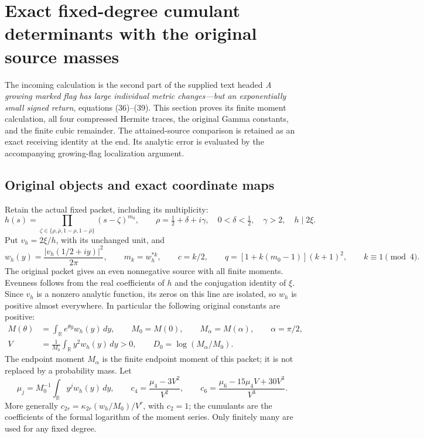\section{Exact fixed-degree cumulant determinants with the original source masses}
\label{sec:FCD}

The incoming calculation is the second part of the supplied text headed
\emph{A growing marked flag has large individual metric changes---but an
exponentially small signed return}, equations (36)--(39).
This section proves its finite moment calculation, all four compressed
Hermite traces, the original Gamma constants, and the finite cubic
remainder. The attained-source comparison is retained as an exact receiving
identity at the end. Its analytic error is evaluated by the accompanying
growing-flag localization argument.

\subsection{Original objects and exact coordinate maps}

Retain the actual fixed packet, including its multiplicity:
\[
 h(s)=\prod_{\zeta\in\{\rho,\bar\rho,1-\rho,1-\bar\rho\}}
       (s-\zeta)^{m_0},\qquad
 \rho=\tfrac12+\delta+i\gamma,\quad
 0<\delta<\tfrac12,\quad\gamma>2,\quad h\mid2\xi.
\]
Put \(v_h=2\xi/h\), with its unchanged unit, and
\[
 w_h(y)=\frac{|v_h(1/2+iy)|^2}{2\pi},\qquad
 m_k=w_h^{*k},\qquad c=k/2,\qquad
 q=[1+k(m_0-1)](k+1)^2,\qquad k\equiv1\pmod4.
\]
The original packet gives an even nonnegative source with all finite moments.
Evenness follows from the real coefficients of \(h\) and the conjugation
identity of \(\xi\). Since \(v_h\) is a nonzero analytic function, its
zeros on this line are isolated, so \(w_h\) is positive almost everywhere.
In particular the following original constants are positive:
\begin{equation}
 \begin{split}
 M(\theta)&=\int_{\mathbb R}e^{\theta y}w_h(y)\,dy,\qquad
 M_0=M(0),\qquad M_\alpha=M(\alpha),\qquad \alpha=\pi/2,\\
 V&=\frac1{M_0}\int_{\mathbb R}y^2w_h(y)\,dy>0,\qquad
 D_0=\log(M_\alpha/M_0).
 \end{split}
 \tag{FCD1}\label{eq:FCD1}
\end{equation}
The endpoint moment \(M_\alpha\) is the finite endpoint moment of this
packet; it is not replaced by a probability mass. Let
\[
 \mu_j=M_0^{-1}\int_{\mathbb R}y^jw_h(y)\,dy,\qquad
 c_4=\frac{\mu_4-3V^2}{V^2},\qquad
 c_6=\frac{\mu_6-15\mu_4V+30V^3}{V^3}.
\]
More generally \(c_{2r}=\kappa_{2r}(w_h/M_0)/V^r\), with \(c_2=1\);
the cumulants are the coefficients of the formal logarithm of the moment
series. Only finitely many are used for any fixed degree.

